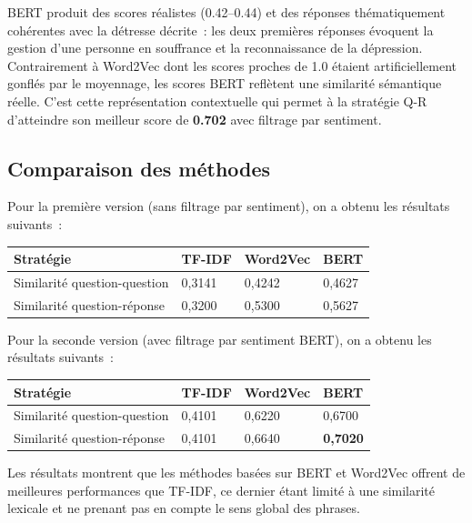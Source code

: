 \documentclass[12pt,a4paper]{report}
\begin{document}
\begin{note}[Interprétation]
BERT produit des scores réalistes (0.42--0.44) et des réponses thématiquement cohérentes avec
la détresse décrite~: les deux premières réponses évoquent la gestion d'une personne en
souffrance et la reconnaissance de la dépression. Contrairement à Word2Vec dont les scores
proches de 1.0 étaient artificiellement gonflés par le moyennage, les scores BERT reflètent
une similarité sémantique réelle. C'est cette représentation contextuelle qui permet à la
stratégie Q-R d'atteindre son meilleur score de \textbf{0.702} avec filtrage par sentiment.
\end{note}

\pagebreak

\subsection{Comparaison des méthodes}

Pour la première version (sans filtrage par sentiment), on a obtenu les résultats suivants~:

\begin{center}
\begin{tabular}{@{}L{5.5cm}C{2.5cm}C{2.5cm}C{2.5cm}@{}}
  \toprule
  Stratégie & TF-IDF & Word2Vec & BERT \\
  \midrule
  Similarité question-question & 0,3141 & 0,4242 & 0,4627 \\
  Similarité question-réponse  & 0,3200 & 0,5300 & 0,5627 \\
  \bottomrule
\end{tabular}
\end{center}

Pour la seconde version (avec filtrage par sentiment BERT), on a obtenu les résultats suivants~:

\begin{center}
\begin{tabular}{@{}L{5.5cm}C{2.5cm}C{2.5cm}C{2.5cm}@{}}
  \toprule
  Stratégie & TF-IDF & Word2Vec & BERT \\
  \midrule
  Similarité question-question & 0,4101 & 0,6220 & 0,6700 \\
  Similarité question-réponse  & 0,4101 & 0,6640 & \textbf{0,7020} \\
  \bottomrule
\end{tabular}
\end{center}

Les résultats montrent que les méthodes basées sur BERT et Word2Vec offrent de meilleures performances que TF-IDF, ce dernier étant limité à une similarité lexicale et ne prenant pas en compte le sens global des phrases.
\end{document}
